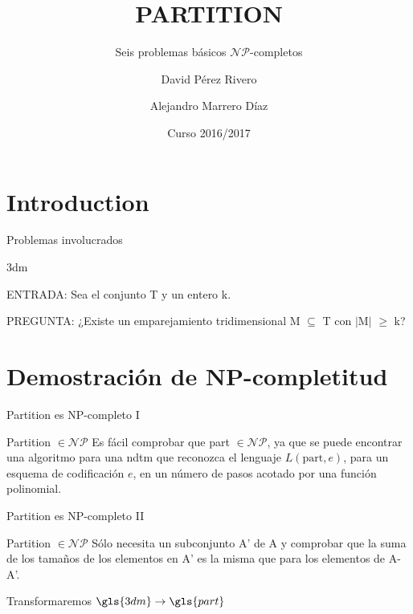 \documentclass[10pt, mathserif, profesionalfont]{beamer}
\title{PARTITION}
\subtitle{Seis problemas básicos $\mathcal{NP}$-completos}
\author{David Pérez Rivero \and Alejandro Marrero Díaz}
\institute[ULL]{Universidad de La Laguna} %
\date{Curso 2016/2017}
\begin{document}
\begin{frame}
  \titlepage
\end{frame}



\section{Introduction}


\begin{frame}{Problemas involucrados}
    
\begin{block}{\gls{3dm}}
{\small 
\noindent ENTRADA: Sea el conjunto T y un entero k.

\noindent PREGUNTA: ¿Existe un emparejamiento tridimensional M $\subseteq$ T con $\mid$M$\mid$ $\geq$ k? 
}
\end{block}

\end{frame}


\section{Demostración de NP-completitud}

\begin{frame}{Partition es NP-completo I}
    
\begin{block}{Partition $\in \mathcal{NP}$}    
Es fácil comprobar que \gls{part}	$\in \mathcal{NP}$, ya que se puede encontrar una algoritmo para una \gls{ndtm} que reconozca el lenguaje $L(\mbox{part},e)$, para un esquema de codificación $e$, en un número de pasos acotado por una función polinomial.

\end{block}

\end{frame}

\begin{frame}{Partition es NP-completo II}
    
\begin{block}{Partition $\in \mathcal{NP}$}   
Sólo necesita un subconjunto A' de A y comprobar que la suma de los tamaños de los elementos en A' es la misma que para los elementos de A-A'.
\end{block}

\begin{block}{} 
Transformaremos $\gls{3dm}\rightarrow\gls{part}$ 
\end{block}

\end{frame}
\end{document}
